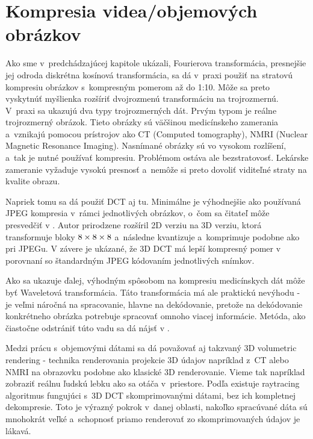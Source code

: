 \section{Kompresia videa/objemových obrázkov}

Ako sme v~predchádzajúcej kapitole ukázali, Fourierova transformácia,
presnejšie jej odroda diskrétna kosínová transformácia, sa dá v~praxi
použiť na stratovú kompresiu obrázkov s~kompresným pomerom až do 1:10.
Môže sa preto vyskytnúť myšlienka rozšíriť dvojrozmenú transformáciu
na trojrozmernú.
V~praxi sa ukazujú dva typy trojrozmerných dát.
Prvým typom je reálne trojrozmerný obrázok. Tieto obrázky sú
väčšinou medicínskeho zamerania a~vznikajú pomocou prístrojov ako CT
(Computed tomography), NMRI (Nuclear Magnetic Resonance Imaging).
Nasnímané obrázky sú vo vysokom rozlíšení, a~tak je nutné používať kompresiu.
Problémom ostáva ale bezstratovosť. Lekárske zameranie vyžaduje vysokú
presnosť a~nemôže si preto dovoliť viditeľné straty na kvalite obrazu.

Napriek tomu sa dá použiť DCT aj tu. Minimálne je výhodnejšie ako
používaná JPEG kompresia v~rámci jednotlivých obrázkov, o~čom sa
čitateľ môže presvedčiť v \cite{medical_dct}. 
Autor prirodzene rozšíril 2D verziu na 3D verziu, 
ktorá transformuje bloky $8\times8\times8$ a~následne kvantizuje a~komprimuje
podobne ako pri JPEGu. V závere je ukázané, že 3D DCT má lepší
kompresný pomer v porovnaní so štandardným JPEG kódovaním jednotlivých
snímkov.

Ako sa ukazuje ďalej, výhodným spôsobom na kompresiu medicínskych dát
môže byť Waveletová transformácia. Táto transformácia má ale praktickú
nevýhodu - je veľmi náročná na spracovanie, hlavne na dekódovanie,
pretože na dekódovanie konkrétneho obrázka potrebuje spracovať omnoho
viacej informácie. Metóda, ako čiastočne odstrániť túto vadu sa dá
nájsť v \cite{wavelet3d}.

Medzi prácu s~objemovými dátami sa dá považovať aj takzvaný 3D volumetric
rendering - technika renderovania projekcie 3D údajov napríklad z~CT
alebo NMRI na obrazovku podobne ako klasické 3D renderovanie. Vieme
tak napríklad zobraziť reálnu ľudskú lebku ako sa otáča v~priestore.
Podľa \cite{volumdct} existuje raytracing algoritmus fungujúci s~3D DCT
skomprimovanými dátami, bez ich kompletnej dekompresie.
Toto je výrazný pokrok v~danej oblasti, nakoľko spracúvané dáta sú
mnohokrát veľké a~schopnosť priamo renderovať zo skomprimovaných
údajov je lákavá.


